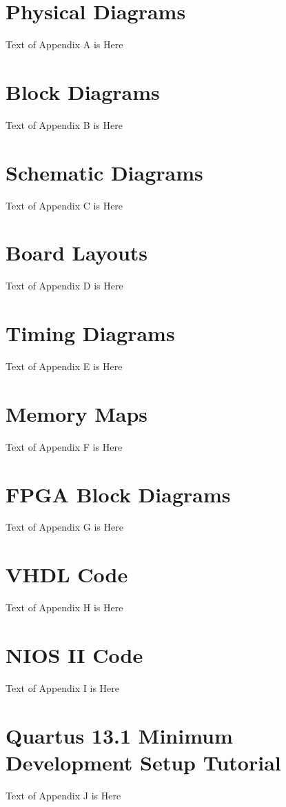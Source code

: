 \begin{appendices}

\chapter{Physical Diagrams} \label{App:physicaldiagrams}

Text of Appendix A is Here

\chapter{Block Diagrams} \label{App:blockdiagrams}

Text of Appendix B is Here

\chapter{Schematic Diagrams} \label{App:schematicdiagrams}

Text of Appendix C is Here

\chapter{Board Layouts} \label{App:boardlayouts}

Text of Appendix D is Here

\chapter{Timing Diagrams} \label{App:timingdiagrams}

Text of Appendix E is Here

\chapter{Memory Maps} \label{App:memorymaps}

Text of Appendix F is Here

\chapter{FPGA Block Diagrams} \label{App:fpgablockdiagrams}

Text of Appendix G is Here

\chapter{VHDL Code} \label{App:vhdlcode}

Text of Appendix H is Here

\chapter{NIOS II Code} \label{App:niosiicode}

Text of Appendix I is Here

\chapter{Quartus 13.1 Minimum Development Setup Tutorial} \label{App:setuptutorial}

Text of Appendix J is Here

\end{appendices}
